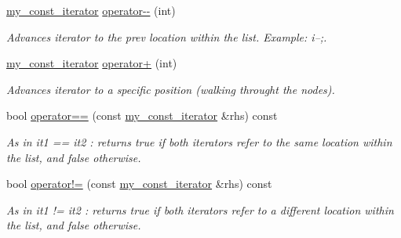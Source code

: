\begin{DoxyCompactItemize}
\mbox{\label{classls_1_1my__const__iterator_a7064f57c440582a60281b7469b1bc5c9}} 
\hyperlink{classls_1_1my__const__iterator}{my\+\_\+const\+\_\+iterator} \hyperlink{classls_1_1my__const__iterator_a7064f57c440582a60281b7469b1bc5c9}{operator-\/-\/} (int)
\begin{DoxyCompactList}\small\item\em Advances iterator to the prev location within the list. Example\+: i--;. \end{DoxyCompactList}\item 
\mbox{\label{classls_1_1my__const__iterator_a8ff72b298122e39a7653e2619d23ea50}} 
\hyperlink{classls_1_1my__const__iterator}{my\+\_\+const\+\_\+iterator} \hyperlink{classls_1_1my__const__iterator_a8ff72b298122e39a7653e2619d23ea50}{operator+} (int)
\begin{DoxyCompactList}\small\item\em Advances iterator to a specific position (walking throught the nodes). \end{DoxyCompactList}\item 
\mbox{\label{classls_1_1my__const__iterator_a28c9d1af27e7e384338b1f9b2deeb7f1}} 
bool \hyperlink{classls_1_1my__const__iterator_a28c9d1af27e7e384338b1f9b2deeb7f1}{operator==} (const \hyperlink{classls_1_1my__const__iterator}{my\+\_\+const\+\_\+iterator} \&rhs) const
\begin{DoxyCompactList}\small\item\em As in it1 == it2 \+: returns true if both iterators refer to the same location within the list, and false otherwise. \end{DoxyCompactList}\item 
\mbox{\label{classls_1_1my__const__iterator_a73aba8c0843327b30e965555374a3c60}} 
bool \hyperlink{classls_1_1my__const__iterator_a73aba8c0843327b30e965555374a3c60}{operator!=} (const \hyperlink{classls_1_1my__const__iterator}{my\+\_\+const\+\_\+iterator} \&rhs) const
\begin{DoxyCompactList}\small\item\em As in it1 != it2 \+: returns true if both iterators refer to a different location within the list, and false otherwise. \end{DoxyCompactList}\end{DoxyCompactItemize}
